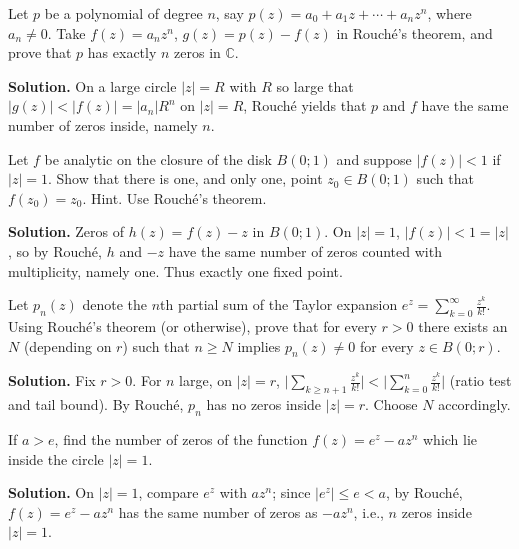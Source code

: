 \begin{problembox}
Let \( p \) be a polynomial of degree \( n \), say \( p(z) = a_0 + a_1 z + \cdots + a_n z^n \), where \( a_n \neq 0 \). Take \( f(z) = a_n z^n \), \( g(z) = p(z) - f(z) \) in Rouché's theorem, and prove that \( p \) has exactly \( n \) zeros in \( \mathbb{C} \).
\end{problembox}

\noindent\textbf{Solution.}
On a large circle $|z|=R$ with $R$ so large that $|g(z)|<|f(z)|=|a_n|R^n$ on $|z|=R$, Rouché yields that $p$ and $f$ have the same number of zeros inside, namely $n$.

\begin{problembox}
Let \( f \) be analytic on the closure of the disk \( B(0; 1) \) and suppose \( |f(z)| < 1 \) if \( |z| = 1 \). Show that there is one, and only one, point \( z_0 \in B(0; 1) \) such that \( f(z_0) = z_0 \). Hint. Use Rouché's theorem.
\end{problembox}

\noindent\textbf{Solution.}
Zeros of $h(z)=f(z)-z$ in $B(0;1)$. On $|z|=1$, $|f(z)|<1=|z|$, so by Rouché, $h$ and $-z$ have the same number of zeros counted with multiplicity, namely one. Thus exactly one fixed point.

\begin{problembox}
Let \( p_n(z) \) denote the \( n \)th partial sum of the Taylor expansion \( e^z = \sum_{k=0}^{\infty} \frac{z^k}{k!} \). Using Rouché's theorem (or otherwise), prove that for every \( r > 0 \) there exists an \( N \) (depending on \( r \)) such that \( n \geq N \) implies \( p_n(z) \neq 0 \) for every \( z \in B(0; r) \).
\end{problembox}

\noindent\textbf{Solution.}
Fix $r>0$. For $n$ large, on $|z|=r$, $\big|\sum_{k\ge n+1} \frac{z^k}{k!}\big|<\big|\sum_{k=0}^{n} \frac{z^k}{k!}\big|$ (ratio test and tail bound). By Rouché, $p_n$ has no zeros inside $|z|=r$. Choose $N$ accordingly.

\begin{problembox}
If \( a > e \), find the number of zeros of the function \( f(z) = e^z - a z^n \) which lie inside the circle \( |z| = 1 \).
\end{problembox}

\noindent\textbf{Solution.}
On $|z|=1$, compare $e^z$ with $a z^n$; since $|e^z|\le e< a$, by Rouché, $f(z)=e^z-az^n$ has the same number of zeros as $-az^n$, i.e., $n$ zeros inside $|z|=1$.

